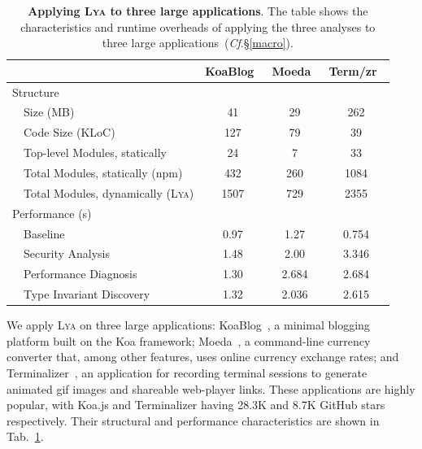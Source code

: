 \documentclass[letterpaper,twocolumn,10pt]{article}
\newcommand{\cf}[1]{(\emph{Cf}.\S\ref{#1})}
\newcommand{\sys}{{\scshape Lya}\xspace}
\begin{document}
\begin{table}[b]
\center
\footnotesize
\setlength\tabcolsep{3pt}
\caption{
  \footnotesize{
    \textbf{Applying \sys to three large applications}.
    The table shows the characteristics and runtime overheads of applying the three analyses to three large applications~\cf{macro}.
  }
}
\begin{tabular*}{\columnwidth}{l @{\extracolsep{\fill}} ccc}
\toprule
                                     & KoaBlog~\cite{koa}    & Moeda~\cite{moeda}   &  Term/zr~\cite{terminalizer} \\
\midrule
Structure                            &                   &                      &              \\
~~Size (MB)                          & 41                &  29                  &   262        \\
~~Code Size (KLoC)                   & 127               &  79                  &   39         \\
~~Top-level Modules, statically      &  24               &  7                   &    33         \\
~~Total Modules, statically (npm)    &  432              &  260                 &    1084       \\
~~Total Modules, dynamically (\sys)  &  1507             &   729                &     2355      \\
Performance (s)                      &                   &                      &              \\
~~Baseline                           &  0.97             &  1.27                &    0.754      \\
~~Security Analysis                  &  1.48             &  2.00                &    3.346      \\
~~Performance Diagnosis              &  1.30             &  2.684               &    2.684      \\
~~Type Invariant Discovery           &  1.32             &  2.036               &    2.615      \\     
\bottomrule
\end{tabular*}
\label{tab:macro}
\vspace{-5mm}
\end{table}


We apply \sys on three large applications:
  KoaBlog~\cite{koa}, a minimal blogging platform built on the Koa framework;
  Moeda~\cite{moeda}, a command-line currency converter that, among other features, uses online currency exchange rates; and
  Terminalizer~\cite{terminalizer}, an application for recording terminal sessions to generate animated gif images and shareable web-player links.
These applications are highly popular, with Koa.js and Terminalizer having 28.3K and 8.7K GitHub stars respectively.
Their structural and performance characteristics are shown in Tab.~\ref{tab:macro}.
\end{document}
